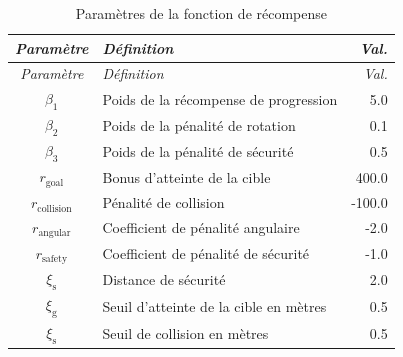 \begin{longtable}{cp{11cm}r}

    \caption{Paramètres de la fonction de récompense}
    \label{tab:reward_parameters}                                                   \\
    \toprule
    \textit{Paramètre}     & \textit{Définition}                    & \textit{Val.} \\
    \midrule
    \endfirsthead
    \toprule
    \textit{Paramètre}     & \textit{Définition}                    & \textit{Val.} \\
    \midrule
    \endhead
    \midrule
    \endfoot
    \bottomrule
    \endlastfoot

    $\beta_1$              & Poids de la récompense de progression  & 5.0           \\
    $\beta_2$              & Poids de la pénalité de rotation       & 0.1           \\
    $\beta_3$              & Poids de la pénalité de sécurité       & 0.5           \\
    $r_{\text{goal}}$      & Bonus d'atteinte de la cible           & 400.0         \\
    $r_{\text{collision}}$ & Pénalité de collision                  & -100.0        \\
    $r_{\text{angular}}$   & Coefficient de pénalité angulaire      & -2.0          \\
    $r_{\text{safety}}$    & Coefficient de pénalité de sécurité    & -1.0          \\
    $\xi_{\text{s}}$       & Distance de sécurité                   & 2.0           \\
    $\xi_{\text{g}}$       & Seuil d'atteinte de la cible en mètres & 0.5           \\
    $\xi_{\text{s}}$       & Seuil de collision en mètres           & 0.5           \\
\end{longtable}

